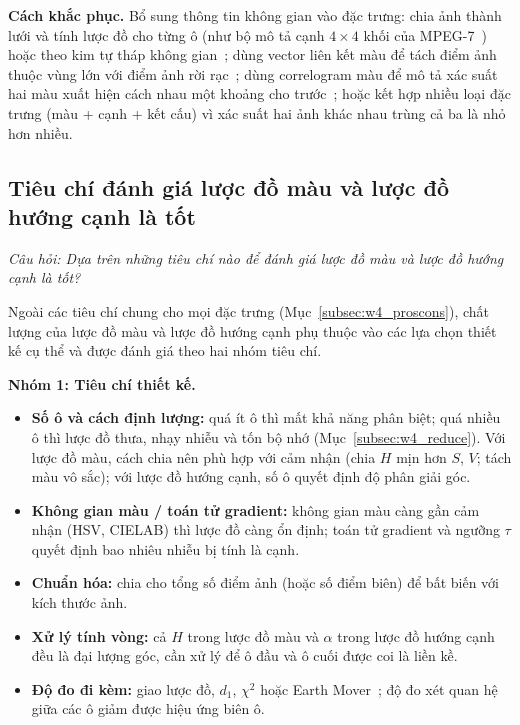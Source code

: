 \textbf{Cách khắc phục.} Bổ sung thông tin không gian vào đặc trưng: chia ảnh thành lưới và tính lược đồ cho từng ô (như bộ mô tả cạnh $4 \times 4$ khối của MPEG-7~\citep{manjunath2001color}) hoặc theo kim tự tháp không gian~\citep{lazebnik2006beyond}; dùng vector liên kết màu để tách điểm ảnh thuộc vùng lớn với điểm ảnh rời rạc~\citep{pass1996comparing}; dùng correlogram màu để mô tả xác suất hai màu xuất hiện cách nhau một khoảng cho trước~\citep{huang1997image}; hoặc kết hợp nhiều loại đặc trưng (màu + cạnh + kết cấu) vì xác suất hai ảnh khác nhau trùng cả ba là nhỏ hơn nhiều.

\subsection{Tiêu chí đánh giá lược đồ màu và lược đồ hướng cạnh là tốt}
\label{subsec:w4_criteria}

\textit{Câu hỏi: Dựa trên những tiêu chí nào để đánh giá lược đồ màu và lược đồ hướng cạnh là tốt?}

Ngoài các tiêu chí chung cho mọi đặc trưng (Mục~\ref{subsec:w4_proscons}), chất lượng của lược đồ màu và lược đồ hướng cạnh phụ thuộc vào các lựa chọn thiết kế cụ thể và được đánh giá theo hai nhóm tiêu chí.

\textbf{Nhóm 1: Tiêu chí thiết kế.}
\begin{itemize}
    \item \textbf{Số ô và cách định lượng:} quá ít ô thì mất khả năng phân biệt; quá nhiều ô thì lược đồ thưa, nhạy nhiễu và tốn bộ nhớ (Mục~\ref{subsec:w4_reduce}). Với lược đồ màu, cách chia nên phù hợp với cảm nhận (chia $H$ mịn hơn $S$, $V$; tách màu vô sắc); với lược đồ hướng cạnh, số ô quyết định độ phân giải góc.
    \item \textbf{Không gian màu / toán tử gradient:} không gian màu càng gần cảm nhận (HSV, CIELAB) thì lược đồ càng ổn định; toán tử gradient và ngưỡng $\tau$ quyết định bao nhiêu nhiễu bị tính là cạnh.
    \item \textbf{Chuẩn hóa:} chia cho tổng số điểm ảnh (hoặc số điểm biên) để bất biến với kích thước ảnh.
    \item \textbf{Xử lý tính vòng:} cả $H$ trong lược đồ màu và $\alpha$ trong lược đồ hướng cạnh đều là đại lượng góc, cần xử lý để ô đầu và ô cuối được coi là liền kề.
    \item \textbf{Độ đo đi kèm:} giao lược đồ, $d_1$, $\chi^2$ hoặc Earth Mover~\citep{rubner2000earth}; độ đo xét quan hệ giữa các ô giảm được hiệu ứng biên ô.
\end{itemize}

